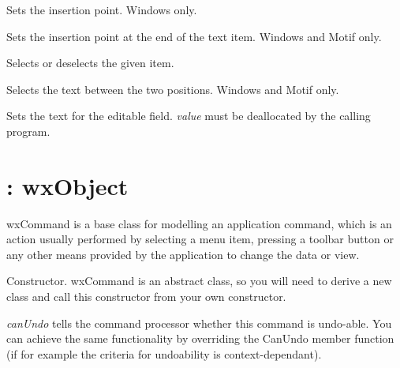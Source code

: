 

Sets the insertion point. Windows only.



Sets the insertion point at the end of the text item. Windows and Motif only.



Selects or deselects the given item.


Selects the text between the two positions. Windows and Motif only.

%
%



Sets the text for the editable field. {\it value} must be deallocated by the calling program.



\section{: wxObject}\label{wxcommand}


wxCommand is a base class for modelling an application command,
which is an action usually performed by selecting a menu item, pressing
a toolbar button or any other means provided by the application to
change the data or view.



Constructor. wxCommand is an abstract class, so you will need to derive
a new class and call this constructor from your own constructor.

{\it canUndo} tells the command processor whether this command is undo-able. You
can achieve the same functionality by overriding the CanUndo member function (if for example
the criteria for undoability is context-dependant).

